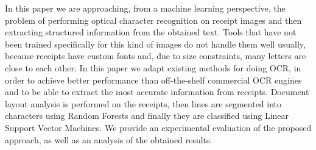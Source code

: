 In this paper we are approaching, from a machine learning perspective, the problem of performing optical character recognition on receipt images and then extracting structured information from the obtained text. Tools that have not been trained specifically for this kind of images do not handle them well usually, because receipts have custom fonts and, due to size constraints, many letters are close to each other. In this paper we adapt existing methods for doing OCR, in order to achieve better performance than off-the-shelf commercial OCR engines and to be able to extract the most accurate information from receipts. Document layout analysis is performed on the receipts, then lines are segmented into characters using Random Forests and finally they are classified using Linear Support Vector Machines. We provide an experimental evaluation of the proposed approach, as well as an analysis of the obtained results. 